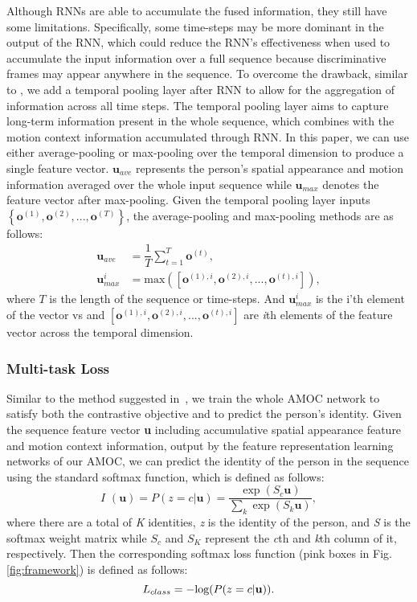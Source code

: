 \documentclass[journal]{IEEEtran}
\begin{document}
Although RNNs are able to accumulate the fused information, they still have some limitations. Specifically, some time-steps may be more dominant in the output of the RNN, which could reduce the RNN’s effectiveness when used to accumulate the input information over a full sequence  because discriminative frames may appear anywhere in the sequence. To overcome the drawback, similar to \cite{mclaughlinrecurrent}, we add a temporal pooling layer after RNN to allow for the aggregation of information across all time steps.  The temporal pooling layer aims to capture long-term information present in the whole sequence, which combines with the motion context information accumulated through RNN. In this paper, we can use either average-pooling  or max-pooling over the temporal dimension to produce a single feature vector. $\textbf{u}_{ave}$ represents the person's spatial appearance and motion information averaged over the whole input sequence while $\textbf{u}_{max}$ denotes the feature vector after max-pooling. Given the temporal pooling layer inputs $\left\lbrace \textbf{o}^{(1)}, \textbf{o}^{(2)}, ...,  \textbf{o}^{(T)} \right\rbrace$, the average-pooling and max-pooling methods are as follows:
\begin{align}
\textbf{u}_{ave} &=\dfrac{1}{T}\sum_{t=1}^{T}\textbf{o}^{(t)},\\
\textbf{u}_{max}^i &=\mathrm{max}\left( \left[ \textbf{o}^{(1),i},\textbf{o}^{(2),i},...,\textbf{o}^{(t),i}\right] \right), 
\end{align}
where $T$ is the length of the sequence or time-steps. And $\textbf{u}_{max}^i$  is the i’th element of the vector vs and $\left[ \textbf{o}^{(1),i},\textbf{o}^{(2),i},...,\textbf{o}^{(t),i}\right]$ are \textit{i}th elements of the feature vector across the temporal dimension.
\subsubsection {Multi-task Loss}
Similar to the method suggested in~\cite{mclaughlinrecurrent}, we train the whole  AMOC network to satisfy both the contrastive objective and to predict the person’s identity. Given the sequence feature vector \textbf{u} including accumulative spatial appearance feature and motion context information, output by the  feature representation learning networks of our AMOC, we can predict the identity of  the person in the sequence using the standard softmax function, which is defined as follows:
\begin{equation}
\textit{I }(\mathbf{u}) = P(z=c|\mathbf{u})=\frac{\exp(S_{c}\mathbf{u})}{\sum_{k}\exp(S_{k} \mathbf{u})},
\end{equation}
where there are a total of \textit{K} identities, \textit{z} is the identity of the person, and \textit{S} is the softmax weight matrix while $S_{c}$ and $S_{K}$ represent the \textit{c}th and \textit{k}th column of it, respectively. Then the corresponding softmax loss function (pink boxes in Fig. \ref{fig:framework}) is defined as follows:
\begin{equation}
L_{class} = -\textup{log}(P(z=c|\mathbf{u})).
\end{equation}
\end{document}
